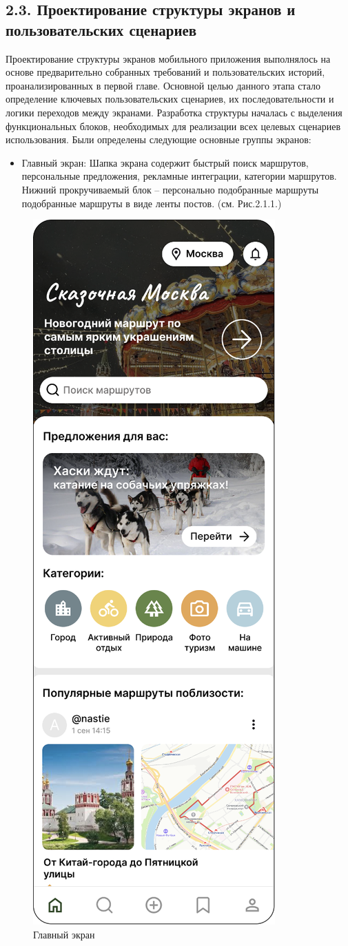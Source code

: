 \subsection*{2.3. Проектирование структуры экранов и пользовательских сценариев} 
Проектирование структуры экранов мобильного приложения выполнялось на основе предварительно собранных требований и пользовательских историй, проанализированных в первой главе. Основной целью данного этапа стало определение ключевых пользовательских сценариев, их последовательности и логики переходов между экранами.
Разработка структуры началась с выделения функциональных блоков, необходимых для реализации всех целевых сценариев использования. Были определены следующие основные группы экранов:
\begin{itemize}
    \item Главный экран: Шапка экрана содержит быстрый поиск маршрутов, персональные предложения, рекламные интеграции, категории маршрутов. Нижний прокручиваемый блок – персонально подобранные маршруты подобранные маршруты в виде ленты постов. (см. Рис.2.1.1.)
\end{itemize}
\begin{figure}[H]
        \centering
        \includegraphics[width=0.4\linewidth]{Images/ui/Picture1.png}
        \caption{Главный экран}
        \label{fig:main_screen_ui_1}
\end{figure}

